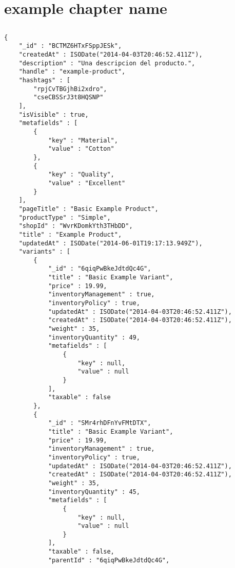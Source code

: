 
\chapter{example chapter name}\label{cap:example_chapter_name}


\section{\collectionsname}\label{cap:example_chapter_name:example_section_name}

\medskip
\begin{lstlisting}[caption= Estructura de un \itemcommerce, label=source:javascript:estructura_itemcommerce]
{
    "_id" : "BCTMZ6HTxFSppJESk",
    "createdAt" : ISODate("2014-04-03T20:46:52.411Z"),
    "description" : "Una descripcion del producto.",
    "handle" : "example-product",
    "hashtags" : [ 
        "rpjCvTBGjhBi2xdro", 
        "cseCBSSrJ3t8HQSNP"
    ],
    "isVisible" : true,
    "metafields" : [ 
        {
            "key" : "Material",
            "value" : "Cotton"
        }, 
        {
            "key" : "Quality",
            "value" : "Excellent"
        }
    ],
    "pageTitle" : "Basic Example Product",
    "productType" : "Simple",
    "shopId" : "WvrKDomkYth3THbDD",
    "title" : "Example Product",
    "updatedAt" : ISODate("2014-06-01T19:17:13.949Z"),
    "variants" : [ 
        {
            "_id" : "6qiqPwBkeJdtdQc4G",
            "title" : "Basic Example Variant",
            "price" : 19.99,
            "inventoryManagement" : true,
            "inventoryPolicy" : true,
            "updatedAt" : ISODate("2014-04-03T20:46:52.411Z"),
            "createdAt" : ISODate("2014-04-03T20:46:52.411Z"),
            "weight" : 35,
            "inventoryQuantity" : 49,
            "metafields" : [ 
                {
                    "key" : null,
                    "value" : null
                }
            ],
            "taxable" : false
        }, 
        {
            "_id" : "SMr4rhDFnYvFMtDTX",
            "title" : "Basic Example Variant",
            "price" : 19.99,
            "inventoryManagement" : true,
            "inventoryPolicy" : true,
            "updatedAt" : ISODate("2014-04-03T20:46:52.411Z"),
            "createdAt" : ISODate("2014-04-03T20:46:52.411Z"),
            "weight" : 35,
            "inventoryQuantity" : 45,
            "metafields" : [ 
                {
                    "key" : null,
                    "value" : null
                }
            ],
            "taxable" : false,
            "parentId" : "6qiqPwBkeJdtdQc4G",

\end{lstlisting}
